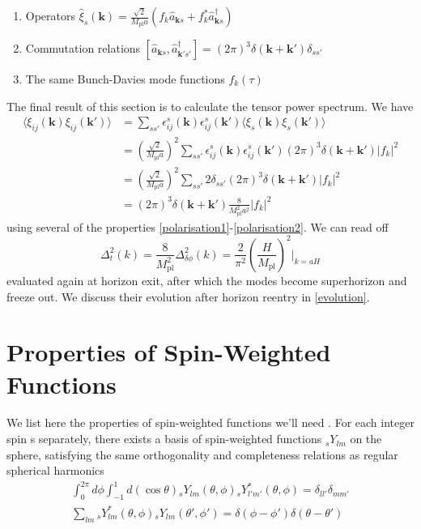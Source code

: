 \documentclass[a4paper,10pt]{article}
\renewcommand{\v}[1]{\mathbf{#1}}
\newcommand{\Mp}{M_{\text{pl}}}
\newcommand{\anns}[2]{\hat{a}_{\v{#1}#2}}
\newcommand{\cres}[2]{\hat{a}^\dagger_{\v{#1}#2}}
\begin{document}
\begin{enumerate}
\item{Operators $\hat{\xi}_s(\v{k}) = \frac{\sqrt{2}}{\Mp a}(f_k\anns{k}{s}+f_k^*\cres{k}{s})$}
\item{Commutation relations $[\anns{k}{s},\cres{k'}{s'}] = (2\pi)^3\delta(\v{k}+\v{k'})\delta_{ss'}$}
\item{The same Bunch-Davies mode functions $f_k(\tau)$}
\end{enumerate}
The final result of this section is to calculate the tensor power spectrum. We have
\begin{equation}\begin{split}
\langle\xi_{ij}(\v{k})\xi_{ij}(\v{k'})\rangle & = \sum_{ss'} \epsilon^s_{ij}(\v{k})\epsilon^s_{ij}(\v{k'})\langle\xi_{s}(\v{k})\xi_{s}(\v{k'})\rangle\\
&= \left(\frac{\sqrt{2}}{\Mp a}\right)^2 \sum_{ss'} \epsilon^s_{ij}(\v{k})\epsilon^s_{ij}(\v{k'})(2\pi)^3\delta(\v{k}+\v{k'})|f_k|^2\\
&= \left(\frac{\sqrt{2}}{\Mp a}\right)^2 \sum_{ss'} 2\delta_{ss'}(2\pi)^3\delta(\v{k}+\v{k'})|f_k|^2\\
&= (2\pi)^3\delta(\v{k}+\v{k'})\frac{8}{\Mp^2a^2}|f_k|^2
\end{split}\end{equation}
using several of the properties \ref{polarisation1}-\ref{polarisation2}. We can read off 
\begin{equation}
\Delta^2_t(k)=\frac{8}{\Mp^2}\Delta^2_{\delta\phi}(k) = \frac{2}{\pi^2}\left(\frac{H}{\Mp}\right)^2 \rvert_{k=aH}
\end{equation}
evaluated again at horizon exit, after which the modes become superhorizon and freeze out. We discuss their evolution after horizon reentry in \ref{evolution}.


\section{Properties of Spin-Weighted Functions}
\label{swf}

We list here the properties of spin-weighted functions we'll need \cite{all-sky}. For each integer spin s separately, there exists a basis of spin-weighted functions $_sY_{lm}$ on the sphere, satisfying the same orthogonality and completeness relations as regular spherical harmonics
\begin{equation}
\begin{split}
\int_0^{2\pi} d\phi \int_{-1}^{1} d(\cos{\theta}) {}_sY_{lm}(\theta,\phi){}_sY_{l'm'}^*(\theta,\phi) = \delta_{ll'}\delta_{mm'} \\
\sum_{lm} {}_sY_{lm}^*(\theta,\phi){}_sY_{lm}(\theta',\phi')=\delta(\phi-\phi')\delta(\theta-\theta')
\end{split}
\end{equation}
\end{document}
